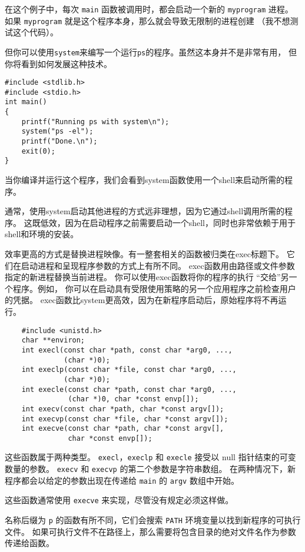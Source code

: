 \documentclass{ctexart}
\begin{document}
在这个例子中，每次 \texttt{main} 函数被调用时，都会启动一个新的 \texttt{myprogram} 进程。
如果 \texttt{myprogram} 就是这个程序本身，那么就会导致无限制的进程创建 （我不想测试这个代码）。  

但你可以使用\texttt{system}来编写一个运行\texttt{ps}的程序。虽然这本身并不是非常有用，
但你将看到如何发展这种技术。
  
\begin{verbatim}  
#include <stdlib.h>  
#include <stdio.h>  
int main()  
{  
    printf("Running ps with system\n");  
    system("ps -el");  
    printf("Done.\n");  
    exit(0);  
}  
\end{verbatim}  
  
当你编译并运行这个程序，我们会看到system函数使用一个shell来启动所需的程序。

通常，使用system启动其他进程的方式远非理想，因为它通过shell调用所需的程序。
这既低效，因为在启动程序之前需要启动一个shell，同时也非常依赖于用于shell和环境的安装。

效率更高的方式是替换进程映像。有一整套相关的函数被归类在exec标题下。
它们在启动进程和呈现程序参数的方式上有所不同。
exec函数用由路径或文件参数指定的新进程替换当前进程。
你可以使用exec函数将你的程序的执行 ``交给''另一个程序。例如，
你可以在启动具有受限使用策略的另一个应用程序之前检查用户的凭据。
exec函数比system更高效，因为在新程序启动后，原始程序将不再运行。

\begin{verbatim}  
    #include <unistd.h>  
    char **environ;  
    int execl(const char *path, const char *arg0, ..., 
              (char *)0);  
    int execlp(const char *file, const char *arg0, ..., 
              (char *)0);  
    int execle(const char *path, const char *arg0, ..., 
               (char *)0, char *const envp[]);  
    int execv(const char *path, char *const argv[]);  
    int execvp(const char *file, char *const argv[]);  
    int execve(const char *path, char *const argv[], 
               char *const envp[]);  
\end{verbatim}  
      
这些函数属于两种类型。 \texttt{execl}，\texttt{execlp} 和 \texttt{execle} 接受以 null 
指针结束的可变数量的参数。 \texttt{execv} 和 \texttt{execvp} 的第二个参数是字符串数组。
在两种情况下，新程序都会以给定的参数出现在传递给 \texttt{main} 的 \texttt{argv} 数组中开始。  
      
这些函数通常使用 \texttt{execve} 来实现，尽管没有规定必须这样做。  
      
名称后缀为 \texttt{p} 的函数有所不同，它们会搜索 \texttt{PATH} 环境变量以找到新程序的可执行文件。
如果可执行文件不在路径上，那么需要将包含目录的绝对文件名作为参数传递给函数。  
      
\end{document}
